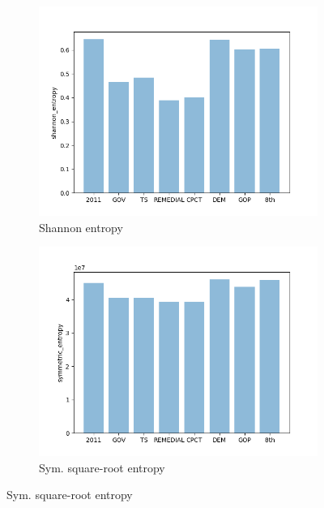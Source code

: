 \documentclass{mgggarticle}
\begin{document}
\begin{figure}
\begin{subfigure}{0.4\textwidth}
\centering
\includegraphics[width=\textwidth]{figs/bars/shannon_entropy_bar.png}
\caption{Shannon entropy}
\end{subfigure}
\begin{subfigure}{0.4\textwidth}
\centering
\includegraphics[width=\textwidth]{figs/bars/symmetric_entropy_bar.png}
\caption{Sym. square-root entropy}
\end{subfigure}


\end{figure}
\end{document}
